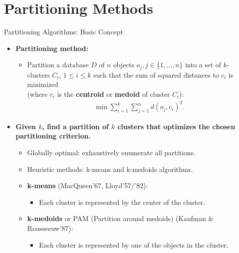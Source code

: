 \section{Partitioning Methods}

\begin{frame}{Partitioning Algorithms: Basic Concept}
	\begin{itemize}
		\item \textbf{Partitioning method:}
		      \begin{itemize}
			      \item Partition a database $D$ of $n$ objects $o_j, j \in \{1,
				            \ldots, n\}$ into a set of $k$-clusters $C_i$, $1 \leq i \leq k$
			            such that the sum of squared distances to $c_i$ is minimized \\
			            (where $c_i$ is the \textbf{\color{airforceblue}centroid} or
			            \textbf{\color{airforceblue}medoid} of cluster $C_i$):
			            \begin{align}
				            \min \sum_{i=1}^{k} \sum_{j=1}^{n} d(o_j,c_i)^2.
			            \end{align}
		      \end{itemize}
		\item \textbf{Given $k$, find a partition of $k$ clusters that
			      optimizes the chosen partitioning criterion.}
		      \begin{itemize}
			      \item Globally optimal: exhaustively enumerate all partitions.
			      \item Heuristic methods: k-means and k-medoids algorithms.
			      \item \textbf{\color{airforceblue}k-means} (MacQueen'67,
			            Lloyd'57/'82):
			            \begin{itemize}
				            \item Each cluster is represented by the center of the cluster.
			            \end{itemize}
			      \item \textbf{\color{airforceblue}k-medoids} or PAM (Partition
			            around medoids) (Kaufman \& Rousseeuw'87):
			            \begin{itemize}
				            \item Each cluster is represented by one of the objects in the
				                  cluster.
			            \end{itemize}
		      \end{itemize}
	\end{itemize}
\end{frame}


